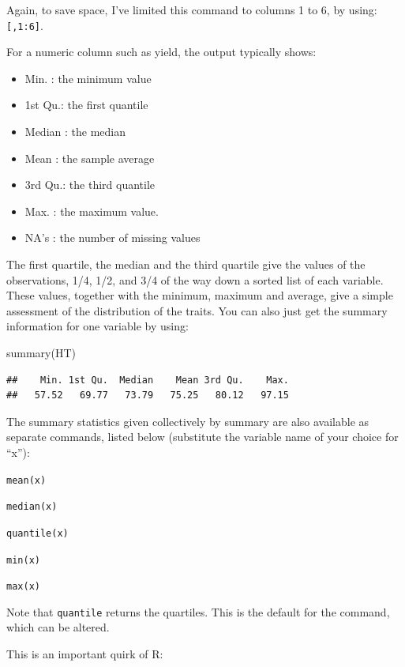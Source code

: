 \documentclass[
]{book}
\newenvironment{Shaded}{\begin{snugshade}}{\end{snugshade}}
\newcommand{\FunctionTok}[1]{\textcolor[rgb]{0.00,0.00,0.00}{#1}}
\newcommand{\NormalTok}[1]{#1}
\providecommand{\tightlist}{%
  \setlength{\itemsep}{0pt}\setlength{\parskip}{0pt}}
\begin{document}
Again, to save space, I've limited this command to columns 1 to 6, by using: \texttt{{[},1:6{]}}.

For a numeric column such as yield, the output typically shows:

\begin{itemize}
\tightlist
\item
  Min. : the minimum value
\item
  1st Qu.: the first quantile
\item
  Median : the median
\item
  Mean : the sample average
\item
  3rd Qu.: the third quantile
\item
  Max. : the maximum value.
\item
  NA's : the number of missing values
\end{itemize}

The first quartile, the median and the third quartile give the values of the observations, 1/4, 1/2, and 3/4 of the way down a sorted list of each variable. These values, together with the minimum, maximum and average, give a simple assessment of the distribution of the traits.
You can also just get the summary information for one variable by using:

\begin{Shaded}
\begin{Highlighting}[]
\FunctionTok{summary}\NormalTok{(HT)}
\end{Highlighting}
\end{Shaded}

\begin{verbatim}
##    Min. 1st Qu.  Median    Mean 3rd Qu.    Max. 
##   57.52   69.77   73.79   75.25   80.12   97.15
\end{verbatim}

The summary statistics given collectively by summary are also available as separate commands, listed below (substitute the variable name of your choice for ``x''):

\texttt{mean(x)}

\texttt{median(x)}

\texttt{quantile(x)}

\texttt{min(x)}

\texttt{max(x)}

Note that \texttt{quantile} returns the quartiles. This is the default for the command, which can be altered.

This is an important quirk of R:
\end{document}
